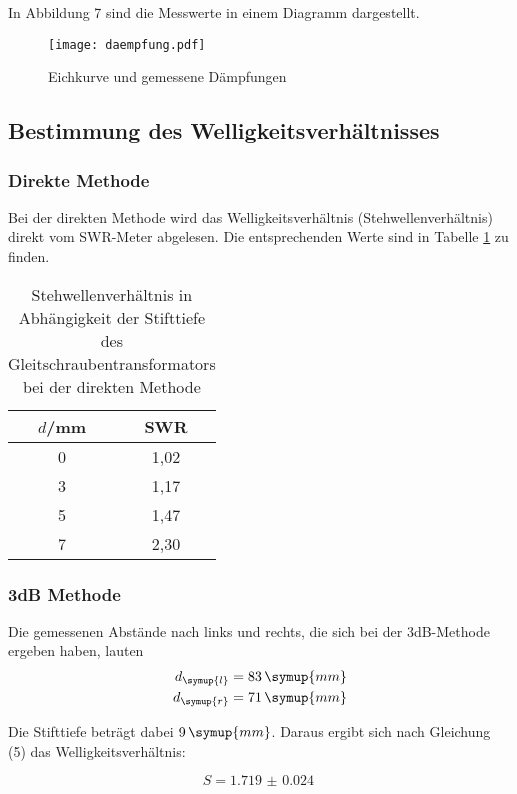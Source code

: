 In Abbildung 7 sind die Messwerte in einem Diagramm dargestellt.

\begin{figure}
  \centering
  \texttt{[image: daempfung.pdf]}
  \caption{Eichkurve und gemessene Dämpfungen}
  \label{fig:plot}
\end{figure}

\subsection{Bestimmung des Welligkeitsverhältnisses}
\subsubsection{Direkte Methode}
Bei der direkten Methode wird das Welligkeitsverhältnis (Stehwellenverhältnis) direkt
vom SWR-Meter abgelesen. Die entsprechenden Werte sind in Tabelle \ref{tab:direkt} zu finden.

\begin{table}[H]
  \centering
  \caption{Stehwellenverhältnis in Abhängigkeit der Stifttiefe des Gleitschraubentransformators bei der direkten Methode}
  \label{tab:direkt}
  \begin{tabular}{c c}
    \toprule
    $d$/mm & SWR \\
    \midrule
    0 &  1,02    \\
    3 &  1,17    \\
    5 &  1,47    \\
    7 &  2,30    \\
    \bottomrule
  \end{tabular}
\end{table}

\subsubsection{3dB Methode}
Die gemessenen Abstände nach links und rechts, die sich bei der 3dB-Methode ergeben haben,
lauten
\begin{align*}
  d_\symup{l} &= 83\, \symup{mm} \\
  d_\symup{r} &= 71\, \symup{mm}
\end{align*}

Die Stifttiefe beträgt dabei $9\, \symup{mm}$.
Daraus ergibt sich nach Gleichung (5) das Welligkeitsverhältnis:

\begin{equation*}
  S = \SI{1.719(24)}{}
\end{equation*}

